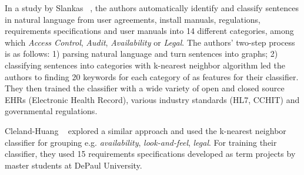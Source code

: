 In a study by Slankas \etal~\cite{Slankas:2013}, the authors automatically
identify and classify sentences in natural language from user agreements, install
manuals, regulations, requirements specifications and user manuals into 14
different \NFR categories, among which \emph{Access Control}, \emph{Audit},
\emph{Availability} or \emph{Legal}.
The authors' two-step process is as follows: 1) parsing natural language and
turn sentences into graphs; 2) classifying sentences
into categories with k-nearest neighbor algorithm led the authors to finding 20
keywords for each category of \NFR as features for their classifier.
They then trained the \NFR classifier with a wide variety of open and closed
source EHRs (Electronic Health Record), various industry standards (HL7, CCHIT)
and governmental regulations.

Cleland-Huang \etal~\cite{Cleland-Huang2007} explored a similar approach and
used the k-nearest neighbor classifier for grouping \NFRs e.g.
\emph{availability}, \emph{look-and-feel}, \emph{legal}. For training their
classifier, they used 15 requirements specifications developed as term projects
by master students at DePaul University.
